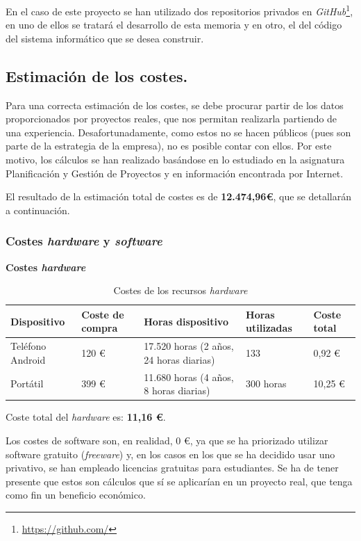 \documentclass[twoside]{report}
\begin{document}
En el caso de este proyecto se han utilizado dos repositorios privados en \textit{GitHub}\footnote{\url{https://github.com/}}, en uno de ellos se tratará el desarrollo de esta memoria y en otro, el del código del sistema informático que se desea construir.

\subsection{Estimación de los costes.}

Para una correcta estimación de los costes, se debe procurar partir de los datos proporcionados por proyectos reales, que nos permitan realizarla partiendo de una experiencia. Desafortunadamente, como estos no se hacen públicos (pues son parte de la estrategia de la empresa), no es posible contar con ellos. Por este motivo, los cálculos se han realizado basándose en lo estudiado en la asignatura Planificación y Gestión de Proyectos \cite{pgptema2} y en información encontrada por Internet.

El resultado de la estimación total de costes es de \textbf{12.474,96\euro}, que se detallarán a continuación.

\subsubsection{Costes \textit{hardware} y \textit{software}}
\textbf{Costes \textit{hardware}}
\begin{table}[H]
\center
\begin{tabular}{|l|l|l|l|l|}
\hline
Dispositivo        & Coste de compra   & Horas dispositivo & Horas utilizadas & Coste total \\ \hline
Teléfono Android   & 120 \euro      & 17.520 horas (2 años, 24 horas diarias)  & 133  & 0,92  \euro \\ \hline
Portátil      & 399 \euro   &  11.680 horas (4 años, 8 horas diarias) & 300 horas  & 10,25 \euro \\ \hline
\end{tabular}
\caption{Costes de los recursos \textit{hardware}}
\end{table}

Coste total del \textit{hardware} es: \textbf{11,16 \euro}.

Los costes de software son, en realidad, 0 \euro, ya que se ha priorizado utilizar software gratuito (\textit{freeware}) y,  en los casos en los que se ha decidido usar uno privativo, se han empleado licencias gratuitas para estudiantes. Se ha de tener presente que estos son cálculos que sí se aplicarían en un proyecto real, que tenga como fin un beneficio económico.
\end{document}
